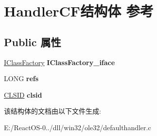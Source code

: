 \hypertarget{struct_handler_c_f}{}\section{Handler\+C\+F结构体 参考}
\label{struct_handler_c_f}
\subsection*{Public 属性}
\begin{DoxyCompactItemize}
\item 
\mbox{\label{struct_handler_c_f_a54183901f6c8968a5b2bb49647f6179a}} 
\hyperlink{interface_i_class_factory}{I\+Class\+Factory} {\bfseries I\+Class\+Factory\+\_\+iface}
\item 
\mbox{\label{struct_handler_c_f_a629b6987b44021c62be2337ce39c1600}} 
L\+O\+NG {\bfseries refs}
\item 
\mbox{\label{struct_handler_c_f_af163f7066d88055bae10d17fb70eb140}} 
\hyperlink{struct___i_i_d}{C\+L\+S\+ID} {\bfseries clsid}
\end{DoxyCompactItemize}


该结构体的文档由以下文件生成\+:\begin{DoxyCompactItemize}
\item 
E\+:/\+React\+O\+S-\/0../dll/win32/ole32/defaulthandler.\+c\end{DoxyCompactItemize}
